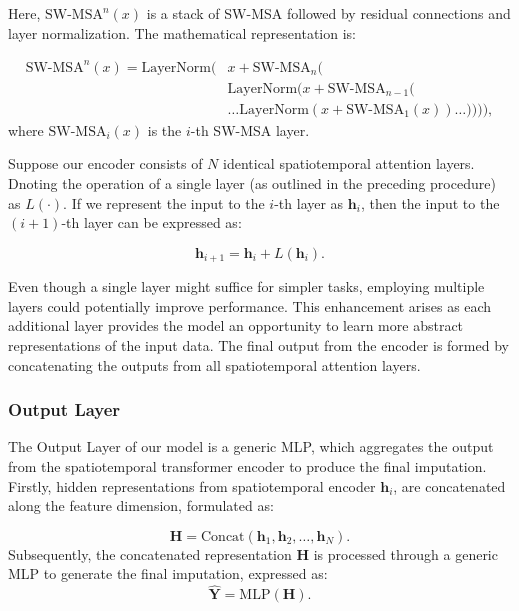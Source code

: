 \documentclass[11pt]{article}
\begin{document}
Here, $\text{SW-MSA}^n(x)$ is a stack of SW-MSA followed by residual connections and layer normalization. The mathematical representation is: 


\begin{align}
\text{SW-MSA}^n(x) = \text{LayerNorm}(&x + \text{SW-MSA}_{n}( \\
&\text{LayerNorm}(x + \text{SW-MSA}_{n-1}( \\
&\ldots \text{LayerNorm}(x + \text{SW-MSA}_{1}(x))\ldots )))),
\end{align}
where $\text{SW-MSA}_i(x)$ is the $i$-th SW-MSA layer. 

Suppose our encoder consists of $N$ identical spatiotemporal attention layers. Dnoting the operation of a single layer (as outlined in the preceding procedure) as $L(\cdot)$. If we represent the input to the $i$-th layer as $\boldsymbol{h}_i$, then the input to the $(i+1)$-th layer can be expressed as:

\begin{equation}
    \boldsymbol{h}_{i+1} = \boldsymbol{h}_i + L(\boldsymbol{h}_i).
\end{equation}

Even though a single layer might suffice for simpler tasks, employing multiple layers could potentially improve performance. This enhancement arises as each additional layer provides the model an opportunity to learn more abstract representations of the input data. The final output from the encoder is formed by concatenating the outputs from all spatiotemporal attention layers.

\subsubsection*{Output Layer}

The Output Layer of our model is a generic MLP, which aggregates the output from the spatiotemporal transformer encoder to produce the final imputation. Firstly, hidden representations from spatiotemporal encoder $\boldsymbol{h}_i$, are concatenated along the feature dimension, formulated as:

\begin{equation}
\boldsymbol{H} = \text{Concat}(\boldsymbol{h}_1, \boldsymbol{h}_2, \ldots, \boldsymbol{h}_N).\end{equation}
Subsequently, the concatenated representation $\boldsymbol{H}$ is processed through a generic MLP to generate the final imputation, expressed as:
\begin{equation}
\hat{\boldsymbol{Y}} = \text{MLP}(\boldsymbol{H}).
\end{equation}
\end{document}

